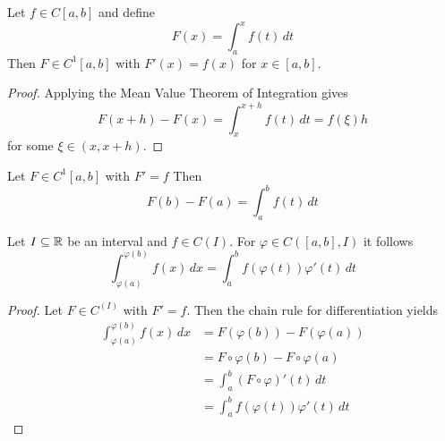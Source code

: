 \begin{theorem}\label{thm:differentiation}
Let \( f \in C[a,b] \) and define 
\[
    F(x) = \int_a^x f(t)\,dt
\]
Then \( F \in C^1[a,b] \) with \( F'(x) = f(x) \) for \( x \in [a,b] \).
\end{theorem}

\begin{proof}
Applying the Mean Value Theorem of Integration gives
\[
    F(x + h) - F(x) =  \int_x^{x + h} f(t)\,dt = f(\xi) h
\]
for some \( \xi \in (x, x + h) \).
\end{proof}
\bigskip

\begin{theorem}\label{thm:fund_calculus}
Let \( F \in C^1[a,b] \) with \( F' = f \)  Then
\[
    F(b) -F(a) = \int_a^b f(t)\,dt
\]
\end{theorem}
\bigskip


\begin{lemma}
Let \( I \subseteq \mathbb{R} \) be an interval and \( f \in C(I) \). For \( \varphi \in C([a,b], I) \) it follows
\[
	\int_{\varphi(a)}^{\varphi(b)} f(x)\,dx = \int_{a}^{b} f(\varphi(t))\varphi'(t)\,dt
\]
\end{lemma}
\begin{proof}
Let \( F \in C^(I) \) with \( F' = f \). Then the chain rule for differentiation yields
\[
	\begin{split}
		\int_{\varphi(a)}^{\varphi(b)} f(x)\,dx 
			&= F(\varphi(b)) - F(\varphi(a)) \\
			&= F\circ\varphi(b) - F\circ\varphi(a) \\
			&= \int_{a}^{b} (F\circ\varphi)'(t)\,dt \\
			&= \int_{a}^{b} f(\varphi(t))\varphi'(t)\,dt
	\end{split}
\]
\end{proof}
\bigskip

